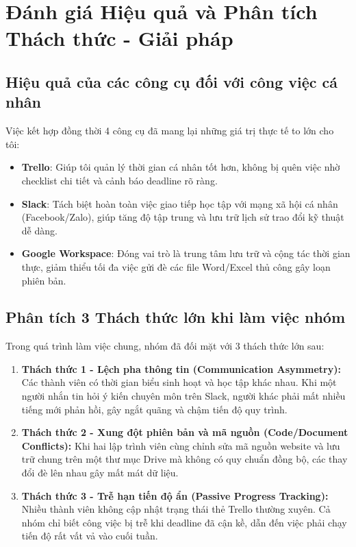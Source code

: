 \documentclass[12pt,a4paper]{article}
\begin{document}
\newpage
\section{Đánh giá Hiệu quả và Phân tích Thách thức - Giải pháp}

\subsection{Hiệu quả của các công cụ đối với công việc cá nhân}
Việc kết hợp đồng thời 4 công cụ đã mang lại những giá trị thực tế to lớn cho tôi:
\begin{itemize}
    \item \textbf{Trello}: Giúp tôi quản lý thời gian cá nhân tốt hơn, không bị quên việc nhờ checklist chi tiết và cảnh báo deadline rõ ràng.
    \item \textbf{Slack}: Tách biệt hoàn toàn việc giao tiếp học tập với mạng xã hội cá nhân (Facebook/Zalo), giúp tăng độ tập trung và lưu trữ lịch sử trao đổi kỹ thuật dễ dàng.
    \item \textbf{Google Workspace}: Đóng vai trò là trung tâm lưu trữ và cộng tác thời gian thực, giảm thiểu tối đa việc gửi đè các file Word/Excel thủ công gây loạn phiên bản.
\end{itemize}

\subsection{Phân tích 3 Thách thức lớn khi làm việc nhóm}
Trong quá trình làm việc chung, nhóm đã đối mặt với 3 thách thức lớn sau:
\begin{enumerate}
    \item \textbf{Thách thức 1 - Lệch pha thông tin (Communication Asymmetry):} Các thành viên có thời gian biểu sinh hoạt và học tập khác nhau. Khi một người nhắn tin hỏi ý kiến chuyên môn trên Slack, người khác phải mất nhiều tiếng mới phản hồi, gây ngắt quãng và chậm tiến độ quy trình.
    \item \textbf{Thách thức 2 - Xung đột phiên bản và mã nguồn (Code/Document Conflicts):} Khi hai lập trình viên cùng chỉnh sửa mã nguồn website và lưu trữ chung trên một thư mục Drive mà không có quy chuẩn đồng bộ, các thay đổi đè lên nhau gây mất mát dữ liệu.
    \item \textbf{Thách thức 3 - Trễ hạn tiến độ ẩn (Passive Progress Tracking):} Nhiều thành viên không cập nhật trạng thái thẻ Trello thường xuyên. Cả nhóm chỉ biết công việc bị trễ khi deadline đã cận kề, dẫn đến việc phải chạy tiến độ rất vất vả vào cuối tuần.
\end{enumerate}
\end{document}
